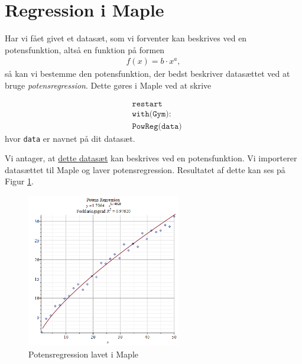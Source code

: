 \section*{Regression i Maple}

Har vi fået givet et datasæt, som vi forventer kan beskrives ved en potensfunktion, altså en funktion på formen
\begin{align*}
	f(x) = b\cdot x^a,
\end{align*}
så kan vi bestemme den potensfunktion, der bedst beskriver datasættet ved at bruge \textit{potensregression}. Dette gøres i Maple ved at skrive

\begin{align*}
	&\texttt{restart}\\
	&\texttt{with(Gym):}\\
	&\texttt{PowReg(data)}
\end{align*}
hvor \texttt{data} er navnet på dit datasæt.

\begin{exa}
	Vi antager, at \href{https://github.com/ChristianJLex/TeachingNotes/raw/master/2023-2024/Data og lign/PotensData.xlsx}{\color{blue!60} dette datasæt} kan beskrives ved en potensfunktion.
	Vi importerer datasættet til Maple og laver potensregression. Resultatet af dette kan ses 
	på Figur \ref{fig:potensregression}.
	\begin{figure}[H]
		\centering
		\includegraphics[width=0.6\textwidth]{Billeder/Potensregression}
		\caption{Potensregression lavet i Maple}
		\label{fig:potensregression}
	\end{figure}
\end{exa}



